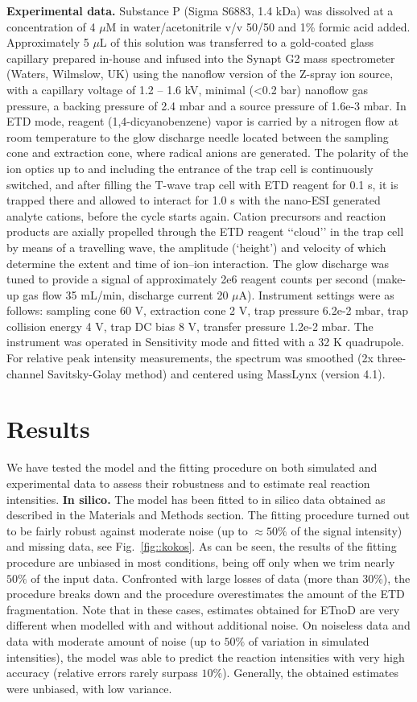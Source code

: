 \documentclass{llncs}
\begin{document}
        \textbf{Experimental data.} Substance P (Sigma S6883, 1.4 kDa) was dissolved at a concentration of 4 $\mu$M in water/acetonitrile v/v 50/50 and 1\% formic acid added. Approximately 5 $\mu$L of this solution was transferred to a gold-coated glass capillary prepared in-house and infused into the Synapt G2 mass spectrometer (Waters, Wilmslow, UK) using the nanoflow version of the Z-spray ion source, with a capillary voltage of 1.2 – 1.6 kV, minimal (<0.2 bar) nanoflow gas pressure, a backing pressure of 2.4 mbar and a source pressure of 1.6e-3 mbar. In ETD mode, reagent (1,4-dicyanobenzene) vapor is carried by a nitrogen flow at room temperature to the glow discharge needle located between the sampling cone and extraction cone, where radical anions are generated. The polarity of the ion optics up to and including the entrance of the trap cell is continuously switched, and after filling the T-wave trap cell with ETD reagent for 0.1 s, it is trapped there and allowed to interact for 1.0 s with the nano-ESI generated analyte cations, before the cycle starts again. Cation precursors and reaction products are axially propelled through the ETD reagent ‘‘cloud’’ in the trap cell by means of a travelling wave, the amplitude (‘height’) and velocity of which determine the extent and time of ion–ion interaction. The glow discharge was tuned to provide a signal of approximately 2e6 reagent counts per second (make-up gas flow 35 mL/min, discharge current 20 $\mu$A). Instrument settings were as follows: sampling cone 60 V, extraction cone 2 V, trap pressure 6.2e-2 mbar, trap collision energy 4 V, trap DC bias 8 V, transfer pressure 1.2e-2 mbar. The instrument was operated in Sensitivity mode and fitted with a 32 K quadrupole. For relative peak intensity measurements, the spectrum was smoothed (2x three-channel Savitsky-Golay method) and centered using MassLynx (version 4.1).
%
        \section{Results}
        We have tested the model and the fitting procedure on both simulated and experimental data to assess their robustness and to estimate real reaction intensities.
%
        \textbf{In silico.} The model has been fitted to in silico data obtained as described in the Materials and Methods section. The fitting procedure turned out to be fairly robust against moderate noise (up to $ \approx 50\%$ of the signal intensity) and missing data, see Fig.~\ref{fig::kokos}. As can be seen, the results of the fitting procedure are unbiased in most conditions, being off only when we trim nearly $50\%$ of the input data. Confronted with large losses of data (more than $30\%$), the procedure breaks down and the procedure overestimates the amount of the ETD fragmentation. Note that in these cases, estimates obtained for ETnoD are very different when modelled with and without additional noise. On noiseless data and data with moderate amount of noise (up to $50\%$ of variation in simulated intensities), the model was able to predict the reaction intensities with very high accuracy (relative errors rarely surpass $10\%$). Generally, the obtained estimates were unbiased, with low variance.
\end{document}

